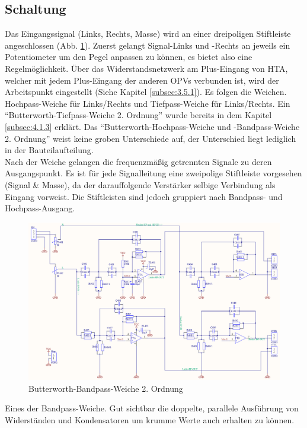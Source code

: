 \subsection{Schaltung}\label{subsec:4.3.2}
Das Eingangssignal (Links, Rechts, Masse) wird an einer dreipoligen Stiftleiste angeschlossen (Abb. \ref{fig:4.3.2.1}).
Zuerst gelangt Signal-Links und -Rechts an jeweils ein Potentiometer um den Pegel anpassen zu können, es bietet also eine Regelmöglichkeit.
Über das Widerstandsnetzwerk am Plus-Eingang von HTA, welcher mit jedem Plus-Eingang der anderen OPVs verbunden ist, wird der Arbeitspunkt eingestellt (Siehe Kapitel \ref{subsec:3.5.1}).
Es folgen die Weichen.
Hochpass-Weiche für Links/Rechts und Tiefpass-Weiche für Links/Rechts.
Ein \enquote{Butterworth-Tiefpass-Weiche 2. Ordnung} wurde bereits in dem Kapitel \ref{subsec:4.1.3} erklärt.
Das \enquote{Butterworth-Hochpass-Weiche und -Bandpass-Weiche 2. Ordnung} weist keine groben Unterschiede auf, der Unterschied liegt lediglich in der Bauteilaufteilung.\\
Nach der Weiche gelangen die frequenzmäßig getrennten Signale zu deren Ausgangspunkt. Es ist für jede Signalleitung eine zweipolige Stiftleiste vorgesehen (Signal \& Masse), da der darauffolgende Verstärker selbige Verbindung als Eingang vorweist.
Die Stiftleisten sind jedoch gruppiert nach Bandpass- und Hochpass-Ausgang.\\
\begin{figure} [H]
	\centering	
	\includegraphics[width=1\textwidth]{img/Print4/4_TTuHTWeiche-Schematic.PNG}
	\caption{Butterworth-Bandpass-Weiche 2. Ordnung}
	\label {fig:4.3.2.1}
\end{figure}
Eines der Bandpass-Weiche.
Gut sichtbar die doppelte, parallele Ausführung von Widerständen und Kondensatoren um krumme Werte auch erhalten zu können.
